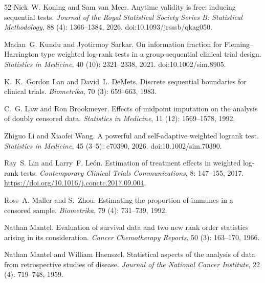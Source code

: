 \documentclass[12pt]{article}
\theoremstyle{definition}
\theoremstyle{remark}
\begin{document}
\begin{thebibliography}{52}
Nick~W. Koning and Sam van Meer.
\newblock Anytime validity is free: inducing sequential tests.
\newblock \emph{Journal of the Royal Statistical Society Series B: Statistical Methodology}, 88 (4): 1366--1384, 2026.
\newblock doi:10.1093/jrsssb/qkag050.

Madan~G. Kundu and Jyotirmoy Sarkar.
\newblock On information fraction for {Fleming--Harrington} type weighted log-rank tests in a group-sequential clinical trial design.
\newblock \emph{Statistics in Medicine}, 40 (10): 2321--2338, 2021.
\newblock doi:10.1002/sim.8905.

K.~K.~Gordon Lan and David~L. DeMets.
\newblock Discrete sequential boundaries for clinical trials.
\newblock \emph{Biometrika}, 70 (3): 659--663, 1983.

C.~G. Law and Ron Brookmeyer.
\newblock Effects of midpoint imputation on the analysis of doubly censored
  data.
\newblock \emph{Statistics in Medicine}, 11 (12): 1569--1578,
  1992.

Zhiguo Li and Xiaofei Wang.
\newblock A powerful and self-adaptive weighted logrank test.
\newblock \emph{Statistics in Medicine}, 45 (3--5): e70390, 2026.
\newblock doi:10.1002/sim.70390.

Ray~S. Lin and Larry~F. Le\'on.
\newblock Estimation of treatment effects in weighted log-rank tests.
\newblock \emph{Contemporary Clinical Trials Communications}, 8:
  147--155, 2017.
\newblock \url{https://doi.org/10.1016/j.conctc.2017.09.004}.

Ross~A. Maller and S.~Zhou.
\newblock Estimating the proportion of immunes in a censored sample.
\newblock \emph{Biometrika}, 79 (4): 731--739, 1992.

Nathan Mantel.
\newblock Evaluation of survival data and two new rank order statistics arising
  in its consideration.
\newblock \emph{Cancer Chemotherapy Reports}, 50 (3):
  163--170, 1966.

Nathan Mantel and William Haenszel.
\newblock Statistical aspects of the analysis of data from retrospective
  studies of disease.
\newblock \emph{Journal of the National Cancer Institute}, 22
  (4): 719--748, 1959.


\end{thebibliography}
\end{document}
